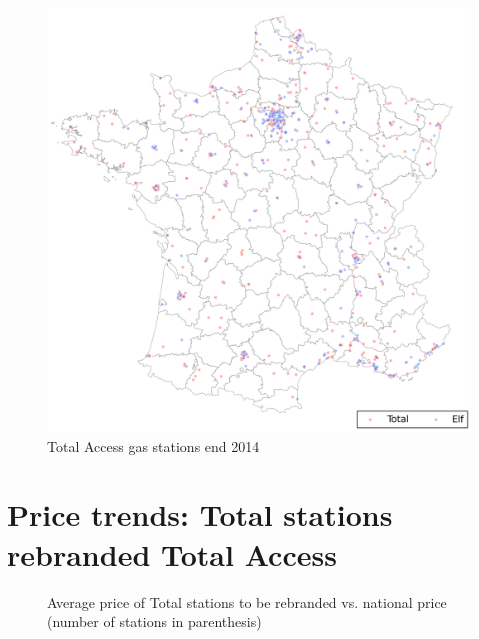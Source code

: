 \documentclass[11pt]{article}
\begin{document}
\begin{figure}[H]
	\centering
		\includegraphics[width=16cm]{graphs/map_ta_adj.png}
	\floatfoot{}
\caption{Total Access gas stations end 2014}
\label{figure:map_ta}
\end{figure}

\section{Price trends: Total stations rebranded Total Access}

\begin{figure}[H]
    \centering
    \qquad
    \caption{Average price of Total stations to be rebranded vs. national price (number of stations in parenthesis)}
    \label{fig:not_yet}
\end{figure}
\end{document}
